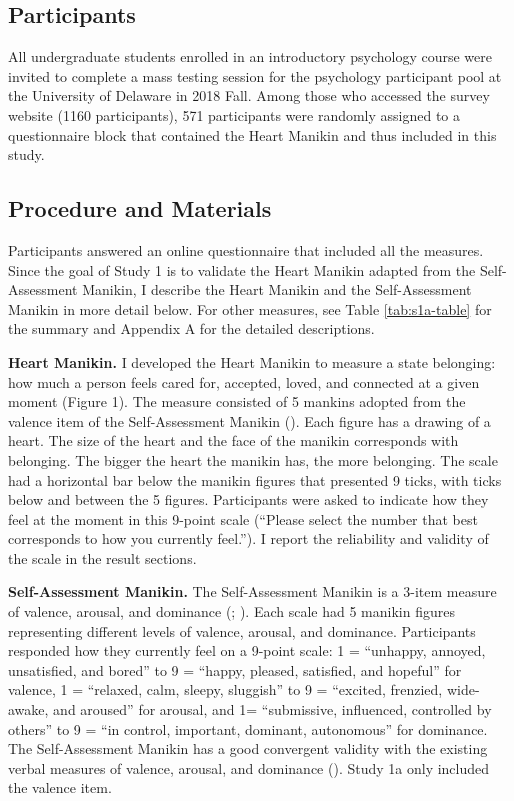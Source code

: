 \documentclass[
]{udthesis}
\begin{document}
\subsection{Participants}\label{participants}

All undergraduate students enrolled in an introductory psychology course
were invited to complete a mass testing session for the psychology
participant pool at the University of Delaware in 2018 Fall. Among those
who accessed the survey website (1160 participants), 571 participants
were randomly assigned to a questionnaire block that contained the Heart
Manikin and thus included in this study.

\subsection{Procedure and Materials}\label{procedure-and-materials}

Participants answered an online questionnaire that included all the
measures. Since the goal of Study 1 is to validate the Heart Manikin
adapted from the Self-Assessment Manikin, I describe the Heart
Manikin and the Self-Assessment Manikin in more detail below. For other
measures, see Table \ref{tab:s1a-table} for the summary and Appendix A
for the detailed descriptions.

\textbf{Heart Manikin.} I developed the Heart Manikin to measure a state
belonging: how much a person feels cared for, accepted, loved, and
connected at a given moment (Figure 1). The measure consisted of 5
mankins adopted from the valence item of the Self-Assessment Manikin (). Each figure
has a drawing of a heart. The size of the heart and the face of the
manikin corresponds with belonging. The bigger the heart the manikin
has, the more belonging. The scale had a horizontal bar below the
manikin figures that presented 9 ticks, with ticks below and between the
5 figures. Participants were asked to indicate how they feel at the
moment in this 9-point scale (``Please select the number that best
corresponds to how you currently feel.''). I report the reliability and
validity of the scale in the result sections.

\textbf{Self-Assessment Manikin.} The Self-Assessment Manikin is a 3-item
measure of valence, arousal, and dominance (; ). Each scale had 5
manikin figures representing different levels of valence, arousal, and
dominance. Participants responded how they currently feel on a 9-point
scale: 1 = ``unhappy, annoyed, unsatisfied, and bored'' to 9 = ``happy,
pleased, satisfied, and hopeful'' for valence, 1 = ``relaxed, calm,
sleepy, sluggish'' to 9 = ``excited, frenzied, wide-awake, and aroused''
for arousal, and 1= ``submissive, influenced, controlled by others'' to 9
= ``in control, important, dominant, autonomous'' for dominance. The
Self-Assessment Manikin has a good convergent validity with the existing
verbal measures of valence, arousal, and dominance ().
Study 1a only
included the valence item.
\end{document}
